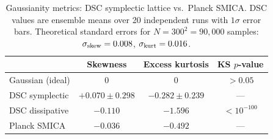 \begin{table}[t]
\centering
\caption{Gaussianity metrics: DSC symplectic lattice vs.\ Planck SMICA.
  DSC values are ensemble means over 20 independent runs with $1\sigma$ error bars.
  Theoretical standard errors for $N=300^2=90{,}000$ samples: $\sigma_{\rm skew}=0.008$, $\sigma_{\rm kurt}=0.016$.}
\label{tab:gaussianity}
\begin{tabular}{lccc}
\toprule
 & Skewness & Excess kurtosis & KS $p$-value \\
\midrule
Gaussian (ideal) & $0$ & $0$ & $>0.05$ \\
DSC symplectic & $+0.070 \pm 0.298$ & $-0.282 \pm 0.239$ & --- \\
DSC dissipative & $-0.110$ & $-1.596$ & $<10^{-100}$ \\
Planck SMICA & $-0.036$ & $-0.492$ & --- \\
\bottomrule
\end{tabular}
\end{table}
